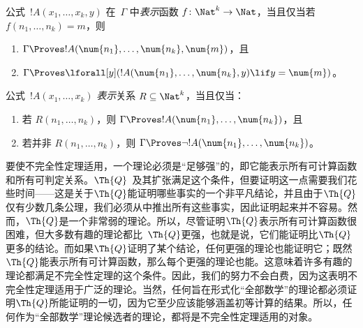 \documentclass[../../../include/open-logic-section]{subfiles}
\begin{document}
\begin{defn}
公式~$!A(x_1, \dots, x_k, y)$ 在~$\Gamma$ 中\emph{表示}函数 $f\colon \Nat^k \to \Nat$，当且仅当若 $f(n_1,
\dots, n_k) = m$，则
\begin{enumerate}
\item $\Gamma \Proves !A(\num{n_1}, \dots, \num{n_k}, \num{m})$，且
\item $\Gamma \Proves \lforall[y](!A(\num{n_1}, \dots, \num{n_k},
y) \lif y = \num{m})$。
\end{enumerate}
\end{defn}

\begin{defn}
公式~$!A(x_1, \dots, x_k)$ \emph{表示}关系 $R \subseteq \Nat^k$，当且仅当：
\begin{enumerate}
\item 若 $R(n_1, \dots, n_k)$，则 $\Gamma \Proves !A(\num{n_1},
\dots, \num{n_k})$，且
\item 若并非 $R(n_1, \dots, n_k)$，则 $\Gamma \Proves \lnot
!A(\num{n_1}, \dots, \num{n_k})$。
\end{enumerate}
\end{defn}

要使不完全性定理适用，一个理论必须是“足够强”的，即它能表示所有可计算函数和所有可判定关系。$\Th{Q}$~及其扩张满足这个条件，但要证明这一点需要我们花些时间——这是关于$\Th{Q}$能证明哪些事实的一个非平凡结论，并且由于$\Th{Q}$仅有少数几条公理，我们必须从中推出所有这些事实，因此证明起来并不容易。然而，$\Th{Q}$是一个非常弱的理论。所以，尽管证明$\Th{Q}$表示所有可计算函数很困难，但大多数有趣的理论都比~$\Th{Q}$更强，也就是说，它们能证明比$\Th{Q}$更多的结论。而如果$\Th{Q}$证明了某个结论，任何更强的理论也能证明它；既然$\Th{Q}$能表示所有可计算函数，那么每个更强的理论也能。这意味着许多有趣的理论都满足不完全性定理的这个条件。因此，我们的努力不会白费，因为这表明不完全性定理适用于广泛的理论。当然，任何旨在形式化“全部数学”的理论都必须证明$\Th{Q}$所能证明的一切，因为它至少应该能够涵盖初等计算的结果。所以，任何作为“全部数学”理论候选者的理论，都将是不完全性定理适用的对象。
\end{document}
